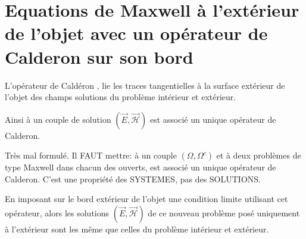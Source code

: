 \documentclass[12pt,%
    twoside,%
    a4paper,%
    openright, %
    ]{book}
\numberwithin{equation}{section} %
\newcommand{\vect}[1]{{\overset{\rightarrow}{#1}}}
\newcommand{\vE}{\vect{E}}
\newcommand{\cH}{\mathcal{H}}
\newcommand{\vH}{\vect{\cH}}
\newcounter{REM}
\newenvironment{REM}[1][\theREM]
    {%
        \stepcounter{REM}
        \hypertarget{REM#1}{}%
        \pdfbookmark[0]{REM \theREM}{REM#1}
        \begin{tcolorbox}[%
                title={Remarque \theREM},%
                colback=red!30!white,%
                colframe=red!75!black,%
            ]
    }
    {
        \end{tcolorbox}%
    }%
\begin{document}
\section{Equations de Maxwell à l'extérieur de l'objet avec un opérateur de Calderon sur son bord}
    L'opérateur de Caldéron \cite[Def~4, p.~108]{cessenat_mathematical_1996}, lie les traces tangentielles à la surface extérieur de l'objet des champs solutions du problème intérieur et extérieur.
    
    Ainsi à un couple de solution \((\vE,\vH)\) est associé un unique opérateur de Calderon.
    \begin{REM}
    Très mal formulé. Il FAUT mettre: à un couple $(\Omega, \Omega^c)$ et à deux problèmes de type Maxwell dans chacun des ouverts, est associé un unique opérateur de Calderon. C'est une propriété des SYSTEMES, pas des SOLUTIONS.
    \end{REM}

    En imposant sur le bord extérieur de l'objet une condition limite utilisant cet opérateur, alors les solutions \((\vE,\vH)\) de ce nouveau problème posé uniquement à l'extérieur sont les même que celles du problème intérieur et extérieur.
\end{document}
